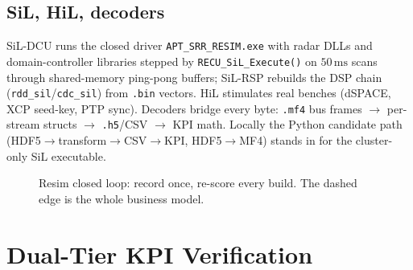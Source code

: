 \documentclass[11pt,oneside]{book}
\begin{document}
\section{SiL, HiL, decoders}
\label{sec:sil-hil}

SiL-DCU runs the closed driver \texttt{APT\_SRR\_RESIM.exe} with radar DLLs
and domain-controller libraries stepped by \texttt{RECU\_SiL\_Execute()} on
$50\,\mathrm{ms}$ scans through shared-memory ping-pong buffers; SiL-RSP
rebuilds the DSP chain (\texttt{rdd\_sil}/\texttt{cdc\_sil}) from
\texttt{.bin} vectors. HiL stimulates real benches (dSPACE, XCP seed-key,
PTP sync). Decoders bridge every byte: \texttt{.mf4} bus frames
$\to$ per-stream structs $\to$ \texttt{.h5}/CSV $\to$ KPI math. Locally the
Python candidate path (HDF5$\to$transform$\to$CSV$\to$KPI, HDF5$\to$MF4)
stands in for the cluster-only SiL executable.

\begin{figure}[htbp]
\centering
{}
\caption{Resim closed loop: record once, re-score every build. The dashed
edge is the whole business model.}
\label{fig:resim-loop}
\end{figure}

\chapter{Dual-Tier KPI Verification}
\label{ch:kpi}
\end{document}
